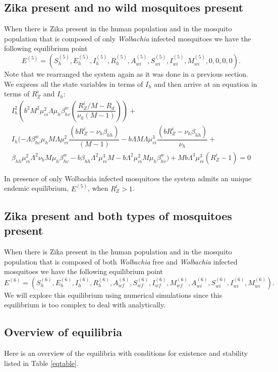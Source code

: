 \documentclass{ws-rv9x6}
\begin{document}
\subsection{Zika present and no wild mosquitoes present}
When there is Zika present in the human population and in the mosquito population that is composed of only \textit{Wolbachia} infected mosquitoes we have the following equilibrium point 
$$E^{(5)}=(S^{(5)}_h,E^{(5)}_h,I^{(5)}_h,R^{(5)}_h,A^{(5)}_{wi},S^{(5)}_{wi},I^{(5)}_{wi},M^{(5)}_{wi},0,0,0,0).$$ 
Note that we rearranged the system again as it was done in a previous section.
We express all the state variables in terms of $I_h$ and then arrive at an equation in terms of $R^i_Z$ and $I_h$:
\begin{multline*}
I^2_h\left(b^2M^2\mu^2_{vi}\Lambda\mu_h\beta^w_{hv}\left(\dfrac{R^i_Z/M-R_d}{\nu_h(M-1)}\right)\right)+\\ I_h(-\Lambda\beta^w_{hv}\mu_hM\Lambda\mu^2_{vi}\dfrac{(bR^i_Z-\nu_h\beta_{hh})}{(M-1)}-b\Lambda M\Lambda\mu^3_{vi}\dfrac{(bR^i_Z-\nu_h\beta_{hh})}{\nu_h}+\\
\beta_{hh}\mu^2_{vi}\Lambda^2\nu_hM\mu_h\beta^w_{hv}-b\beta_{hh}\Lambda^2\mu^3_{vi}M-b\Lambda^2\mu^2_{vi}M\mu_h\beta^w_{hv})+
Mb\Lambda^3\mu^3_{vi}(R^{i}_Z-1)=0
\end{multline*}

\begin{theorem}
 In presence of only Wolbachia infected mosquitoes the system admits an unique endemic equilibrium, $E^{(5)}$, when $R^i_Z>1$. 
\end{theorem}
\subsection{Zika present and both types of mosquitoes present}
When there is Zika present in the human population and in the mosquito population that is composed of both \textit{Wolbachia} free and \textit{Wolbachia} infected mosquitoes we have the following equilibrium point 
   $$E^{(6)}=(S^{(6)}_h,E^{(6)}_h,I^{(6)}_h,R^{(6)}_h,A^{(6)}_{wf},S^{(6)}_{wf},I^{(6)}_{wf},M^{(6)}_{wf},A^{(6)}_{wi},S^{(6)}_{wi},I^{(6)}_{wi},M^{(6)}_{wi}).$$ We will explore this equilibrium using numerical simulations since this equilibrium is too complex to deal with analytically.
 \subsection{Overview of equilibria}
 Here is an overview of the equilibria with conditions for existence and stability listed in Table \ref{eqtable}.
 
\end{document}

